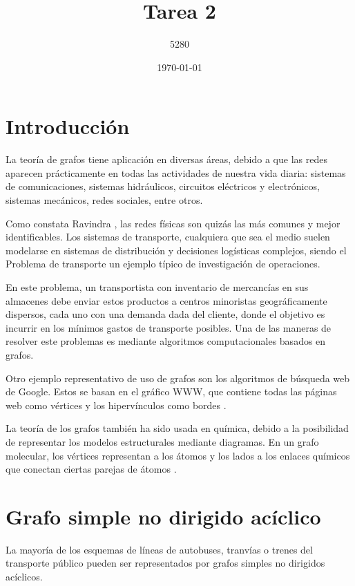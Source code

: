 \documentclass{article}
\title{
Tarea 2
}
\author{5280}
\date{\today}
\begin{document}
\maketitle


\section*{Introducción}

La teoría de grafos tiene aplicación en diversas áreas, debido a que las redes aparecen prácticamente en todas las actividades de nuestra vida diaria: sistemas de comunicaciones, sistemas hidráulicos, circuitos eléctricos y electrónicos, sistemas mecánicos, redes sociales, entre otros. 

Como constata Ravindra \cite{ahuja2017network}, las redes físicas son quizás las más comunes y mejor identificables. Los sistemas de transporte, cualquiera que sea el medio suelen modelarse en sistemas de distribución  y decisiones logísticas complejos, siendo el Problema de transporte un ejemplo típico de investigación de operaciones. 

En este problema, un transportista con inventario de mercancías en sus almacenes debe enviar estos productos a centros minoristas geográficamente dispersos, cada uno con una demanda dada del cliente, donde el objetivo es incurrir en los mínimos gastos de transporte posibles. Una de las maneras de resolver este problemas es mediante algoritmos computacionales basados en grafos.

Otro ejemplo representativo de uso de grafos son los algoritmos de búsqueda web de Google. Estos se basan en el gráfico WWW, que contiene todas las páginas web como vértices y los  hipervínculos como bordes \cite{chung2010graph}.

La teoría de los grafos también ha sido usada en química, debido a la posibilidad de representar los modelos estructurales mediante diagramas. En un grafo molecular, los vértices representan a los átomos y los lados a los enlaces químicos que conectan ciertas parejas de átomos \cite{amador}.


\section{Grafo simple no dirigido acíclico}

La mayoría de los esquemas de líneas de autobuses, tranvías o trenes del transporte público pueden ser representados por grafos simples no dirigidos acíclicos.
\end{document}

